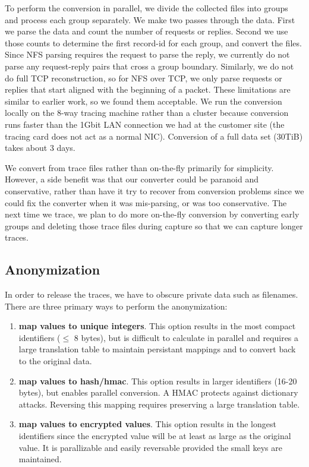 To perform the conversion in parallel, we divide the collected files
into groups and process each group separately.  We make two passes
through the data.  First we parse the data and count the number of
requests or replies.  Second we use those counts to determine the
first record-id for each group, and convert the files.  Since NFS
parsing requires the request to parse the reply, we currently do not
parse any request-reply pairs that cross a group boundary.  Similarly,
we do not do full TCP reconstruction, so for NFS over TCP, we only
parse requests or replies that start aligned with the beginning of a
packet. These limitations are similar to earlier work, so we found
them acceptable.  We run the conversion locally on the 8-way tracing
machine rather than a cluster because conversion runs faster than the
1Gbit LAN connection we had at the customer site (the tracing card
does not act as a normal NIC).  Conversion of a full data set (30TiB)
takes about 3 days.

We convert from trace files rather than on-the-fly primarily for
simplicity.  However, a side benefit was that our converter could be
paranoid and conservative, rather than have it try to recover from
conversion problems since we could fix the converter when it was
mis-parsing, or was too conservative.  The next time we trace, we plan
to do more on-the-fly conversion by converting early groups and
deleting those trace files during capture so that we can capture
longer traces.

\subsection{Anonymization}

In order to release the traces, we have to obscure private data such
as filenames.  There are three primary ways to perform the anonymization: 

\begin{enumerate}

\item {\bf map values to unique integers}.  This option results in the
most compact identifiers ($\leq$ 8 bytes), but is difficult to
calculate in parallel and requires a large translation table to
maintain persistant mappings and to convert back to the original data.

\item {\bf map values to hash/hmac}.  This option results in larger
identifiers (16-20 bytes), but enables parallel conversion.  A HMAC
protects against dictionary attacks.  Reversing this mapping requires
preserving a large translation table.

\item {\bf map values to encrypted values}.  This option results in
the longest identifiers since the encrypted value will be at least as
large as the original value.  It is parallizable and easily reversable
provided the small keys are maintained.

\end{enumerate}

